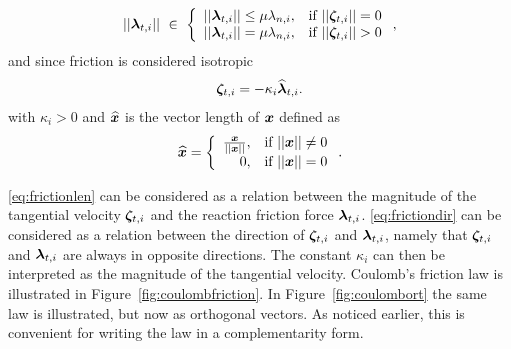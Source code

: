 \documentclass[DC2017114Bouma.tex]{subfiles}
\begin{document}
\begin{align}
||\lambdab_{t,i}||\ \in\ \left\{ \begin{array}{ll}
||\lambdab_{t,i}||\leq\mu\lambda_{n,i}, &\text{if }||\zetab_{t,i}||=0\\
||\lambdab_{t,i}|| = \mu\lambda_{n,i}, &\text{if }||\zetab_{t,i}||>0
\end{array}\right.,\label{eq:frictionlen}
\end{align}
and since friction is considered isotropic
\begin{align}
\boldsymbol{\zeta}_{t,i} = -\kappa_i\widehat{\boldsymbol{\lambda}}_{t,i}.\label{eq:frictiondir}
\end{align}
with $\kappa_i>0$ and $\widehat{{\boldsymbol{x}}}$ is the vector length of ${\boldsymbol{x}}$ defined as
\begin{equation}
\widehat{{\boldsymbol{x}}} = \left\lbrace\begin{array}{rr}
\frac{{\boldsymbol{x}}}{||{\boldsymbol{x}}||}, & \text{if } ||{\boldsymbol{x}}|| \neq 0\\
0, & \text{if } ||{\boldsymbol{x}}|| = 0\\
\end{array}\right. .\label{eq:vectorlen}
\end{equation}

\eqref{eq:frictionlen} can be considered as a relation between the magnitude of the tangential velocity $\boldsymbol{\zeta}_{t,i}$ and the reaction friction force $\boldsymbol{\lambda}_{t,i}$. \eqref{eq:frictiondir} can be considered as a relation between the direction of $\boldsymbol{\zeta}_{t,i}$ and $\boldsymbol{\lambda}_{t,i}$, namely that $\boldsymbol{\zeta}_{t,i}$ and $\boldsymbol{\lambda}_{t,i}$ are always in opposite directions. The constant $\kappa_i$ can then be interpreted as the magnitude of the tangential velocity. Coulomb's friction law is illustrated in Figure~\ref{fig:coulombfriction}. In Figure~\ref{fig:coulombort} the same law is illustrated, but now as orthogonal vectors. As noticed earlier, this is convenient for writing the law in a complementarity form.
\end{document}
